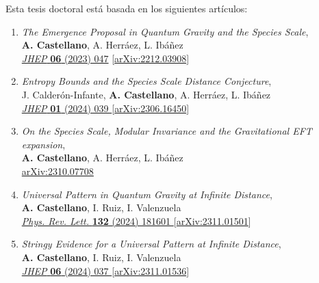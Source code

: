 Esta tesis doctoral está basada en los siguientes artículos:
\begin{enumerate}
\item[{\hypersetup{hidelinks}\cite{Castellano:2022bvr}}]{\emph{The Emergence Proposal in Quantum Gravity and the Species Scale},\\
\textbf{A. Castellano}, A. Herr\'aez, L. Ib\'añez\\
\href{https://link.springer.com/article/10.1007/JHEP06(2023)047}{\emph{JHEP} \textbf{06} (2023) 047} 
[\href{https://arxiv.org/abs/2212.03908}{arXiv:2212.03908}]}

\item[{\hypersetup{hidelinks}\cite{Calderon-Infante:2023ler}}]{\emph{Entropy Bounds and the Species Scale Distance Conjecture}, \\
J. Calder\'on-Infante, \textbf{A. Castellano}, A. Herr\'aez, L. Ib\'añez\\
\href{https://link.springer.com/article/10.1007/JHEP01(2024)039}{\emph{JHEP} \textbf{01} (2024) 039 } 
[\href{https://arxiv.org/abs/2306.16450}{arXiv:2306.16450}]}

\item[{\hypersetup{hidelinks}\cite{Castellano:2023aum}}]{\emph{On the Species Scale, Modular Invariance and the Gravitational EFT expansion}, \\
\textbf{A. Castellano}, A. Herr\'aez, L. Ib\'añez\\ 
\href{https://arxiv.org/abs/2310.07708}{arXiv:2310.07708}}

\item[{\hypersetup{hidelinks}\cite{PhysRevLett.132.181601}}]{\emph{Universal Pattern in Quantum Gravity at Infinite Distance}, \\
\textbf{A. Castellano}, I. Ruiz, I. Valenzuela \\ 
\href{https://journals.aps.org/prl/abstract/10.1103/PhysRevLett.132.181601}{\emph{Phys. Rev. Lett.} \textbf{132} (2024) 181601 } 
[\href{https://arxiv.org/abs/2311.01501}{arXiv:2311.01501}]}

\item[{\hypersetup{hidelinks}\cite{Castellano:2023jjt}}]{\emph{Stringy Evidence for a Universal Pattern at Infinite Distance}, \\
\textbf{A. Castellano}, I. Ruiz, I. Valenzuela \\ 
\href{https://link.springer.com/article/10.1007/JHEP06(2024)037?utm_source=rct_congratemailt&utm_medium=email&utm_campaign=oa_20240608&utm_content=10.1007/JHEP06(2024)037}{\emph{JHEP} \textbf{06} (2024) 037 } 
[\href{https://arxiv.org/abs/2311.01536}{arXiv:2311.01536}]}

\end{enumerate}

